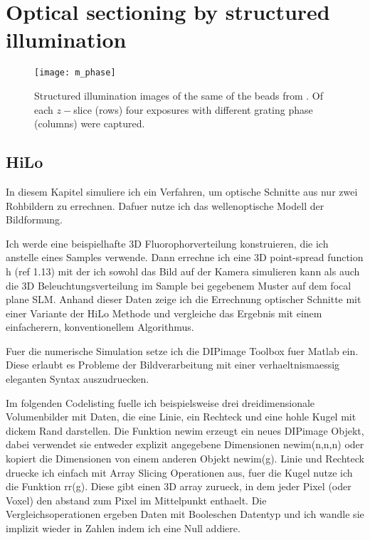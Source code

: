 \chapter{Optical sectioning by structured illumination}


\begin{figure}[H]
  \centering
  \texttt{[image: m\_phase]}
  \caption{Structured illumination images of the same of the beads
    from . Of each $z-$slice (rows) four exposures
    with different grating phase (columns) were captured.}
  \label{fig:m_phase}
\end{figure}

\section{HiLo}

In diesem Kapitel simuliere ich ein Verfahren, um optische Schnitte
aus nur zwei Rohbildern zu errechnen. Dafuer nutze ich das
wellenoptische Modell der Bildformung.

Ich werde eine beispielhafte 3D Fluorophorverteilung konstruieren,
die ich anstelle eines Samples verwende. Dann errechne ich eine 3D
point-spread function h (ref 1.13) mit der ich sowohl das Bild auf
der Kamera simulieren kann als auch die 3D Beleuchtungsverteilung im
Sample bei gegebenem Muster auf dem focal plane SLM. Anhand dieser
Daten zeige ich die Errechnung optischer Schnitte mit einer Variante
der HiLo Methode und vergleiche das Ergebnis mit einem einfacherern,
konventionellem Algorithmus.

Fuer die numerische Simulation setze ich die DIPimage Toolbox fuer
Matlab ein. Diese erlaubt es Probleme der Bildverarbeitung mit einer
verhaeltnismaessig eleganten Syntax auszudruecken. 

 Im folgenden Codelisting fuelle ich
beispielsweise drei dreidimensionale Volumenbilder mit Daten, die eine
Linie, ein Rechteck und eine hohle Kugel mit dickem Rand
darstellen. Die Funktion newim erzeugt ein neues DIPimage Objekt,
dabei verwendet sie entweder explizit angegebene Dimensionen
newim(n,n,n) oder kopiert die Dimensionen von einem anderen Objekt
newim(g). Linie und Rechteck druecke ich einfach mit Array Slicing
Operationen aus, fuer die Kugel nutze ich die Funktion rr(g). Diese
gibt einen 3D array zurueck, in dem jeder Pixel (oder Voxel) den
abstand zum Pixel im Mittelpunkt enthaelt. Die Vergleichsoperationen
ergeben Daten mit Booleschen Datentyp und ich wandle sie implizit
wieder in Zahlen indem ich eine Null addiere.

